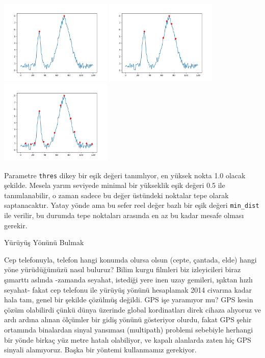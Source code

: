 \documentclass[12pt,fleqn]{article}\usepackage{../../common}
\begin{document}
\includegraphics[height=4cm]{compscieng_app40walk_04.png}
\includegraphics[height=4cm]{compscieng_app40walk_05.png}
\includegraphics[height=4cm]{compscieng_app40walk_07.png}

Parametre \verb!thres! dikey bir eşik değeri tanımlıyor, en yüksek nokta
1.0 olacak şekilde. Mesela yarım seviyede minimal bir yükseklik eşik değeri
0.5 ile tanımlanabilir, o zaman sadece bu değer üstündeki noktalar tepe
olarak saptanacaktır. Yatay yönde ama bu sefer reel değer bazlı bir eşik
değeri \verb!min_dist! ile verilir, bu durumda tepe noktaları arasında en
az bu kadar mesafe olması gerekir.

Yürüyüş Yönünü Bulmak

Cep telefonuyla, telefon hangi konumda olursa olsun (cepte, çantada, elde)
hangi yöne yürüdüğümüzü nasıl buluruz? Bilim kurgu filmleri biz
izleyicileri biraz şımarttı aslında -zamanda seyahat, istediği yere inen
uzay gemileri, ışıktan hızlı seyahat- fakat cep telefonu ile yürüyüş yönünü
hesaplamak 2014 civarına kadar hala tam, genel bir şekilde çözülmüş
değildi. GPS işe yaramıyor mu? GPS kesin çözüm olabilirdi çünkü dünya
üzerinde global kordinatları direk cihaza alıyoruz ve ardı ardına alınan
ölçümler bir gidiş yönünü gösteriyor olurdu, fakat GPS şehir ortamında
binalardan sinyal yansıması (multipath) problemi sebebiyle herhangi bir
yönde birkaç yüz metre hatalı olabiliyor, ve kapalı alanlarda zaten hiç GPS
sinyali alamıyoruz. Başka bir yöntemi kullanmamız gerekiyor.
\end{document}
